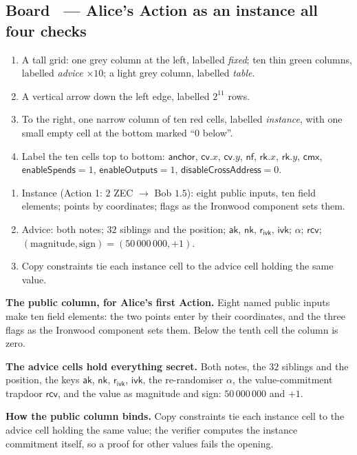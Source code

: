 \documentclass[11pt,a4paper]{article}
\makeatletter
\newcommand{\nfsym}{\ensuremath{\mathsf{nf}}}
\newcommand{\cmx}{\ensuremath{\mathsf{cmx}}}
\newcommand{\cvsym}{\ensuremath{\mathsf{cv}}}
\newcommand{\rksym}{\ensuremath{\mathsf{rk}}}
\newcommand{\aksym}{\ensuremath{\mathsf{ak}}}
\newcommand{\nksym}{\ensuremath{\mathsf{nk}}}
\newcommand{\ivk}{\ensuremath{\mathsf{ivk}}}
\newcommand{\rcv}{\ensuremath{\mathsf{rcv}}}
\newcommand{\rivk}{\ensuremath{\mathsf{r_{ivk}}}}
\newcounter{board}
\newenvironment{board}[2]{\stepcounter{board}%
  \subsection*{Board \theboard\ --- #1 \hfill {\normalfont\small\color{arb}#2}}}{\medskip}
\newcommand{\Draw}{\draw@head{Draw}}
\newcommand{\Write}{\draw@head{Write}}
\newcommand{\Say}{\draw@head{Say}}
\makeatother
\begin{document}
\begin{board}{Alice's Action as an instance}{all four checks}
\Draw
\begin{enumerate}
  \item A tall grid: one grey column at the left, labelled
    \emph{fixed}; ten thin green columns, labelled \emph{advice}
    $\times 10$; a light grey column, labelled \emph{table}.
  \item A vertical arrow down the left edge, labelled $2^{11}$ rows.
  \item To the right, one narrow column of ten red cells, labelled
    \emph{instance}, with one small empty cell at the bottom marked
    ``$0$ below''.
  \item Label the ten cells top to bottom: $\mathsf{anchor}$,
    $\cvsym.x$, $\cvsym.y$, $\nfsym$, $\rksym.x$, $\rksym.y$, $\cmx$,
    $\mathsf{enableSpends} = 1$, $\mathsf{enableOutputs} = 1$,
    $\mathsf{disableCrossAddress} = 0$.
\end{enumerate}
\begin{center}
\wbGInstanceFig
\end{center}
\Write
\begin{enumerate}
  \item Instance (Action 1: $2$ ZEC $\to$ Bob $1.5$): eight public
    inputs, ten field elements; points by coordinates; flags as the
    Ironwood component sets them.
  \item Advice: both notes; $32$ siblings and the position; $\aksym$,
    $\nksym$, $\rivk$, $\ivk$; $\alpha$; $\rcv$;
    $(\mathrm{magnitude}, \mathrm{sign}) = (50\,000\,000, +1)$.
  \item Copy constraints tie each instance cell to the advice cell
    holding the same value.
\end{enumerate}
\Say
\textbf{The public column, for Alice's first Action.} Eight named
public inputs make ten field elements: the two points enter by their
coordinates, and the three flags as the Ironwood component sets them.
Below the tenth cell the column is zero.

\textbf{The advice cells hold everything secret.} Both notes, the
$32$ siblings and the position, the keys $\aksym$, $\nksym$, $\rivk$,
$\ivk$, the re-randomiser $\alpha$, the value-commitment trapdoor
$\rcv$, and the value as magnitude and sign: $50\,000\,000$ and $+1$.

\textbf{How the public column binds.} Copy constraints tie each
instance cell to the advice cell holding the same value; the verifier
computes the instance commitment itself, so a proof for other values
fails the opening.


\end{board}
\end{document}
